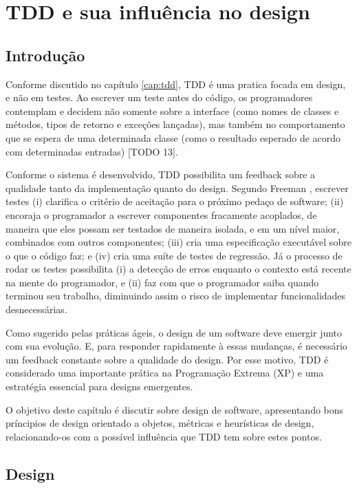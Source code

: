 \chapter{TDD e sua influência no design}
\label{cap:design}

\section{Introdução}
\label{sec:design-introducao}

Conforme discutido no capítulo \ref{cap:tdd}, TDD é uma pratica focada em design, e não em testes.
Ao escrever um teste antes do código, os programadores contemplam e decidem não somente sobre a interface (como nomes de classes e 
métodos, tipos de retorno e exceções lançadas), mas também no comportamento que se espera de uma determinada classe 
(como o resultado esperado de acordo com determinadas entradas) [TODO 13].

Conforme o sistema é desenvolvido, TDD possibilita um feedback sobre a qualidade tanto da implementação quanto do design. Segundo 
Freeman \cite{GOOS}, escrever testes (i) clarifica o critério de aceitação para o próximo pedaço de software; (ii) encoraja o programador
a escrever componentes fracamente acoplados, de maneira que eles possam ser testados de maneira isolada, e em um nível maior, combinados
com outros componentes; (iii) cria uma especificação executável sobre o que o código faz; e (iv) cria uma suíte de testes de regressão.
Já o processo de rodar os testes possibilita (i) a detecção de erros enquanto o contexto está recente na mente do programador, e (ii)
faz com que o programador saiba quando terminou seu trabalho, diminuindo assim o risco de implementar funcionalidades desnecessárias.

Como sugerido pelas práticas ágeis,
o design de um software deve emergir junto com sua evolução. E, para responder rapidamente à essas mudanças, é necessário
um feedback constante sobre a qualidade do design. Por esse motivo, TDD é considerado uma importante prática na Programação 
Extrema (XP) \cite{XPExplained} e uma estratégia essencial para designs emergentes.

O objetivo deste capítulo é discutir sobre design de software, apresentando
bons príncipios de design orientado a objetos, métricas e heurísticas de design, relacionando-os com a possível influência 
que TDD tem sobre estes pontos.

\section{Design}

